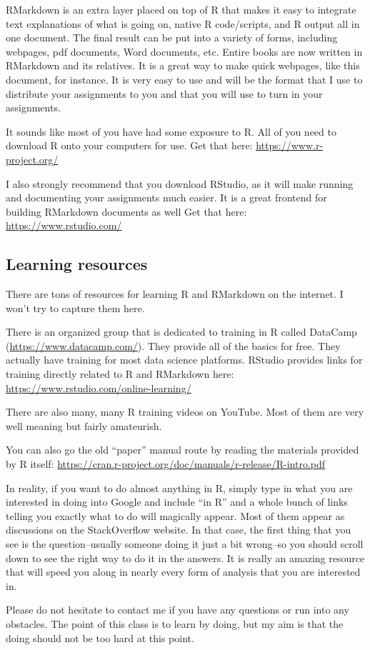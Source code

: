 \documentclass[
]{book}
\begin{document}
RMarkdown is an extra layer placed on top of R that makes it easy to integrate text explanations of what is going on, native R code/scripts, and R output all in one document. The final result can be put into a variety of forms, including webpages, pdf documents, Word documents, etc. Entire books are now written in RMarkdown and its relatives. It is a great way to make quick webpages, like this document, for instance. It is very easy to use and will be the format that I use to distribute your assignments to you and that you will use to turn in your assignments.

It sounds like most of you have had some exposure to R. All of you need to download R onto your computers for use. Get that here:
\url{https://www.r-project.org/}

I also strongly recommend that you download RStudio, as it will make running and documenting your assignments much easier. It is a great frontend for building RMarkdown documents as well Get that here:
\url{https://www.rstudio.com/}

\hypertarget{learning-resources}{%
\subsection{Learning resources}\label{learning-resources}}

There are tons of resources for learning R and RMarkdown on the internet. I won't try to capture them here.

There is an organized group that is dedicated to training in R called DataCamp (\url{https://www.datacamp.com/}). They provide all of the basics for free. They actually have training for most data science platforms. RStudio provides links for training directly related to R and RMarkdown here:
\url{https://www.rstudio.com/online-learning/}

There are also many, many R training videos on YouTube. Most of them are very well meaning but fairly amateurish.

You can also go the old ``paper'' manual route by reading the materials provided by R itself:
\url{https://cran.r-project.org/doc/manuals/r-release/R-intro.pdf}

In reality, if you want to do almost anything in R, simply type in what you are interested in doing into Google and include ``in R'' and a whole bunch of links telling you exactly what to do will magically appear. Most of them appear as discussions on the StackOverflow website. In that case, the first thing that you see is the question--usually someone doing it just a bit wrong--so you should scroll down to see the right way to do it in the answers. It is really an amazing resource that will speed you along in nearly every form of analysis that you are interested in.

Please do not hesitate to contact me if you have any questions or run into any obstacles. The point of this class is to learn by doing, but my aim is that the doing should not be too hard at this point.

  
\end{document}

